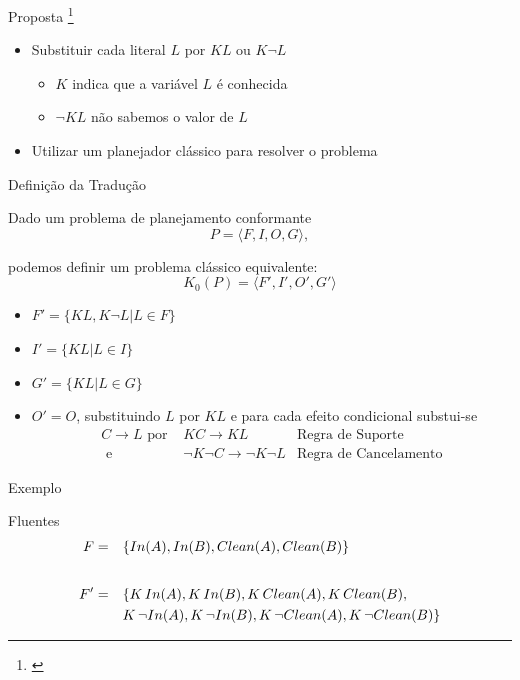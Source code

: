 \begin{frame}{Proposta \footnote{\cite{Palacios:2009}}}
    \begin{itemize}
    \item Substituir cada literal $L$ por $ KL$ ou $K \lnot L$ 
        \begin{itemize}
            \item $K$ indica que a variável $L$ é conhecida 
            \item $\lnot KL$ não sabemos o valor de $L$
        \end{itemize}  
    \item Utilizar um planejador clássico para resolver o problema
    \end{itemize}  
\end{frame}

\begin{frame}{Definição da Tradução}

    Dado um problema de planejamento conformante\\
    \[P=\langle F, I, O, G\rangle,\]
    
    podemos definir um problema clássico equivalente:\\
    \[K_0(P)=\langle F', I', O', G'\rangle\]
    \begin{itemize}
        \item $F' = \{ KL, K \lnot L | L \in F \}$
        \item $I' = \{ KL | L \in I \}$
        \item $G' = \{ KL | L \in G \}$
        \item $O' = O$, substituindo $L$ por $KL$ e para cada efeito condicional substui-se 
        \begin{align*}C \rightarrow L \text{ por } & KC \rightarrow KL &\text{Regra de Suporte} \\ 
                                        \text{ e } & \lnot K \lnot C \rightarrow \lnot K \lnot L& \text{Regra de Cancelamento}
        \end{align*}
    \end{itemize}  
\end{frame}

\begin{frame}{Exemplo}
     \begin{block}{Fluentes}
        \begin{align*}
                F = \quad  & \{ In(A),In(B),Clean(A),Clean(B) \} \\ \intertext{}
                F' = \quad  & \{ K\, In(A),K\, In(B),K\, Clean(A),K\, Clean(B),\\
                            & K\,\lnot In(A),K\,\lnot In(B),K\,\lnot Clean(A),K\,\lnot Clean(B) \}\\
        \end{align*}
    \end{block}    
\end{frame}

